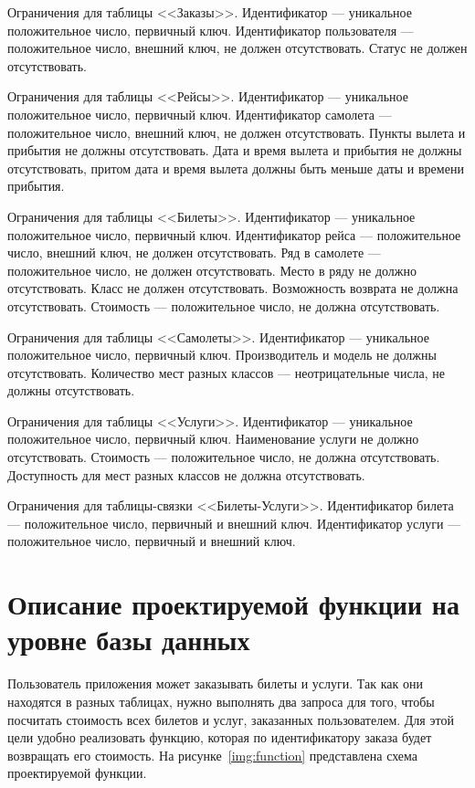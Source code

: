 \documentclass{bmstu}
\begin{document}
Ограничения для таблицы <<Заказы>>. 
Идентификатор --- уникальное положительное число, первичный ключ. 
Идентификатор пользователя --- положительное число, внешний ключ, не должен отсутствовать. 
Статус не должен отсутствовать.

Ограничения для таблицы <<Рейсы>>. 
Идентификатор --- уникальное положительное число, первичный ключ. 
Идентификатор самолета --- положительное число, внешний ключ, не должен отсутствовать. 
Пункты вылета и прибытия не должны отсутствовать. 
Дата и время вылета и прибытия не должны отсутствовать, притом дата и время вылета должны быть меньше даты и времени прибытия. 

Ограничения для таблицы <<Билеты>>. 
Идентификатор --- уникальное положительное число, первичный ключ. 
Идентификатор рейса --- положительное число, внешний ключ, не должен отсутствовать. 
Ряд в самолете --- положительное число, не должен отсутствовать. 
Место в ряду не должно отсутствовать. 
Класс не должен отсутствовать. 
Возможность возврата не должна отсутствовать. 
Стоимость --- положительное число, не должна отсутствовать.

Ограничения для таблицы <<Самолеты>>. 
Идентификатор --- уникальное положительное число, первичный ключ. 
Производитель и модель не должны отсутствовать. 
Количество мест разных классов --- неотрицательные числа, не должны отсутствовать. 

Ограничения для таблицы <<Услуги>>. 
Идентификатор --- уникальное положительное число, первичный ключ. 
Наименование услуги не должно отсутствовать. 
Стоимость --- положительное число, не должна отсутствовать.
Доступность для мест разных классов не должна отсутствовать.

Ограничения для таблицы-связки <<Билеты-Услуги>>. 
Идентификатор билета --- положительное число, первичный и внешний ключ. 
Идентификатор услуги --- положительное число, первичный и внешний ключ. 

\pagebreak
\section{Описание проектируемой функции на уровне базы данных}

Пользователь приложения может заказывать билеты и услуги. 
Так как они находятся в разных таблицах, нужно выполнять два запроса для того, чтобы посчитать стоимость всех билетов и услуг, заказанных пользователем. 
Для этой цели удобно реализовать функцию, которая по идентификатору заказа будет возвращать его стоимость. 
На рисунке~\ref{img:function} представлена схема проектируемой функции.
\end{document}

